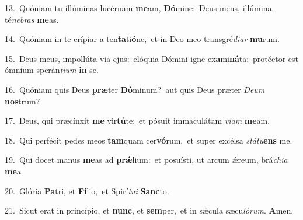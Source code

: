 {\numbfont\textcolor{\numbcolor}{13.}}~Quóniam tu illúminas lucérnam \textbf{me}\-am, \textbf{Dó}\-mine:~\star Deus meus, illúmina té\-\textit{ne}\-\textit{bras} \textbf{me}\-as.\par
{\numbfont\textcolor{\numbcolor}{14.}}~Quóniam in te erípiar a ten\-\textbf{ta}\-ti\-\textbf{ó}\-ne,~\star et in Deo meo transgré\-\textit{di}\-\textit{ar} \textbf{mu}\-rum.\par
{\numbfont\textcolor{\numbcolor}{15.}}~Deus meus, impollúta via ejus:~\dagger elóquia Dómini igne ex\-\textbf{a}\-mi\-\textbf{ná}\-ta:~\star protéctor est ómnium sperán\-\textit{ti}\-\textit{um} \textbf{in} se.\par
{\numbfont\textcolor{\numbcolor}{16.}}~Quóniam quis Deus \textbf{præ}\-ter \textbf{Dó}\-minum?~\star aut quis Deus præter \textit{De}\-\textit{um} \textbf{nos}\-trum?\par
{\numbfont\textcolor{\numbcolor}{17.}}~Deus, qui præcínxit \textbf{me} vir\-\textbf{tú}\-te:~\star et pósuit immaculátam \textit{vi}\-\textit{am} \textbf{me}\-am.\par
{\numbfont\textcolor{\numbcolor}{18.}}~Qui perfécit pedes meos \textbf{tam}\-quam cer\-\textbf{vó}\-rum,~\star et super excélsa \textit{stá}\-\textit{tu}\textbf{ens} me.\par
{\numbfont\textcolor{\numbcolor}{19.}}~Qui docet manus \textbf{me}\-as ad \textbf{prǽ}\-lium:~\star et posuísti, ut arcum ǽreum, brá\-\textit{chi}\-\textit{a} \textbf{me}\-a.\par
{\numbfont\textcolor{\numbcolor}{20.}}~Glória \textbf{Pa}\-tri, et \textbf{Fí}\-lio,~\star et Spirí\-\textit{tu}\-\textit{i} \textbf{Sanc}\-to.\par
{\numbfont\textcolor{\numbcolor}{21.}}~Sicut erat in princípio, et \textbf{nunc}\-, et \textbf{sem}\-per,~\star et in sǽcula sæcu\-\textit{ló}\-\textit{rum}. \textbf{A}\-men.\par
